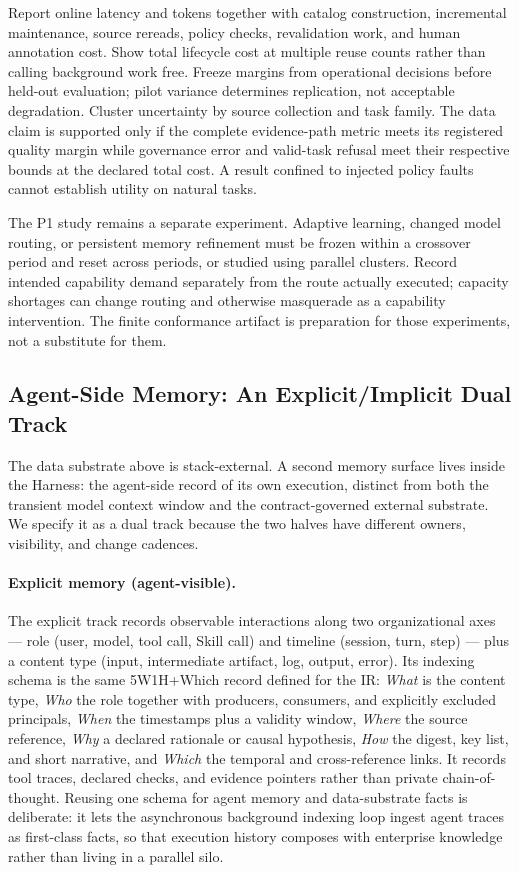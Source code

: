 Report online latency and tokens together with catalog construction, incremental maintenance, source rereads, policy checks, revalidation work, and human annotation cost. Show total lifecycle cost at multiple reuse counts rather than calling background work free. Freeze margins from operational decisions before held-out evaluation; pilot variance determines replication, not acceptable degradation. Cluster uncertainty by source collection and task family. The data claim is supported only if the complete evidence-path metric meets its registered quality margin while governance error and valid-task refusal meet their respective bounds at the declared total cost. A result confined to injected policy faults cannot establish utility on natural tasks.

The P1 study remains a separate experiment. Adaptive learning, changed model routing, or persistent memory refinement must be frozen within a crossover period and reset across periods, or studied using parallel clusters. Record intended capability demand separately from the route actually executed; capacity shortages can change routing and otherwise masquerade as a capability intervention. The finite conformance artifact is preparation for those experiments, not a substitute for them.

\subsection{Agent-Side Memory: An Explicit/Implicit Dual Track}
\label{sec:memory-dualtrack}

The data substrate above is stack-external. A second memory surface lives inside the Harness: the agent-side record of its own execution, distinct from both the transient model context window and the contract-governed external substrate. We specify it as a dual track because the two halves have different owners, visibility, and change cadences.

\paragraph{Explicit memory (agent-visible).}
The explicit track records observable interactions along two organizational axes --- role (user, model, tool call, Skill call) and timeline (session, turn, step) --- plus a content type (input, intermediate artifact, log, output, error). Its indexing schema is the same 5W1H+Which record defined for the IR: \textit{What} is the content type, \textit{Who} the role together with producers, consumers, and explicitly excluded principals, \textit{When} the timestamps plus a validity window, \textit{Where} the source reference, \textit{Why} a declared rationale or causal hypothesis, \textit{How} the digest, key list, and short narrative, and \textit{Which} the temporal and cross-reference links. It records tool traces, declared checks, and evidence pointers rather than private chain-of-thought. Reusing one schema for agent memory and data-substrate facts is deliberate: it lets the asynchronous background indexing loop ingest agent traces as first-class facts, so that execution history composes with enterprise knowledge rather than living in a parallel silo.

